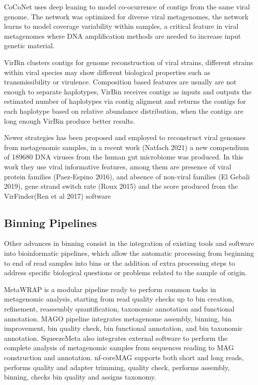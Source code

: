 \documentclass{article}
\begin{document}
CoCoNet uses deep leaning to model co-ocurrence of contigs from the same viral genome. The network was optimized for diverse viral metagenomes, the network learns to model coverage variability within samples, a critical feature in viral metagenomes where DNA amplification methods are needed to increase input genetic material.

VirBin clusters contigs for genome reconstruction of viral strains, different strains within viral species may show different biological properties such as transmissibility or virulence. Composition based features are usually are not enough to separate haplotypes, VirBin receives contigs as inputs and outputs the estimated number of haplotypes via contig aligment and returns the contigs for each haplotype based on relative abundance distribution, when the contigs are long enough VirBin produce better results.

Newer strategies has been proposed and employed to reconstruct viral genomes from metagenomic samples, in a recent work (Natfach 2021) a new compendium of 189680 DNA viruses from the human gut microbiome was produced. In this work they use viral informative features, among them are presence of viral protein families (Paez-Espino 2016), and absence of non-viral families (El Gebali 2019), gene strand switch rate (Roux 2015) and the score produced from the VirFinder(Ren et al 2017) software  

\subsection{Binning Pipelines}
Other advances in binning consist in the integration of existing tools and software into bioinformatic pipelines, which  allow the automatic processing from beginning to end of read samples into bins or the addition of extra processing steps to address specific biological questions or problems related to the sample of origin.


MetaWRAP is a modular pipeline ready to perform common tasks in metagenomic analysis, starting from read quality checks up to bin creation, refinement, reassembly quantification, taxonomic annotation and functional annotation.
MAGO pipeline integrates metagenome assembly, binning, bin improvement, bin quality check, bin functional annotation, and bin taxonomic annotation. 
SqueezeMeta also integrates external software to perform the complete analysis of metagenomic samples from sequences reading to MAG construction and annotation.%
nf-coreMAG supports both short and long reads, performs quality and adapter trimming, quality check,  performs assembly, binning, checks bin quality and assigns taxonomy.
\end{document}
